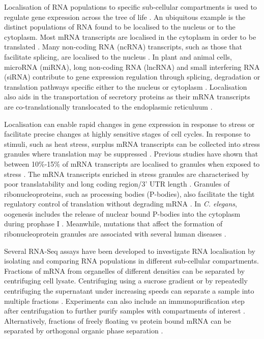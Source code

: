\documentclass[../main.tex]{subfiles}
\begin{document}
Localisation of RNA populations to specific sub-cellular compartments is used to regulate gene expression across the tree of life \parencite{Das2021}.
An ubiquitous example is the distinct populations of RNA found to be localised to the nucleus or to the cytoplasm. 
Most mRNA transcripts are localised in the cytoplasm in order to be translated \parencite{Kohler2007}.
Many non-coding RNA (ncRNA) transcripts, such as those that facilitate splicing, are localised to the nucleus \parencite{Will2011}. 
In plant and animal cells, microRNA (miRNA), long non-coding RNA (lncRNA) and small interfering RNA (siRNA) contribute to gene expression regulation through splicing, degradation or translation pathways specific either to the nucleus or cytoplasm \parencite{Hombach2016}.
Localisation also aids in the transportation of secretory proteins as their mRNA transcripts are co-translationally translocated to the endoplasmic reticuluum \parencite{Jan2014}.

Localisation can enable rapid changes in gene expression in response to stress or facilitate precise changes at highly sensitive stages of cell cycles.
In response to stimuli, such as heat stress, surplus mRNA transcripts can be collected into stress granules where translation may be suppressed \parencite{Anderson2009}. 
Previous studies have shown that between 10\%-15\% of mRNA transcripts are localised to granules when exposed to stress \parencite{VanTreeck2018,Khong2017}.
The mRNA transcripts enriched in stress granules are characterised by poor translatability and long coding region/3' UTR length \parencite{Khong2017}.
Granules of ribonucleoproteins, such as processing bodies (P-bodies), also facilitate the tight regulatory control of translation without degrading mRNA \parencite{Buchan2014}.
In \textit{C. elegans}, oogenesis includes the release of nuclear bound P-bodies into the cytoplasm during prophase I \parencite{Voronina2011}.
Meanwhile, mutations that affect the formation of ribonucleoprotein granules are associated with several human diseases \parencite{Mackenzie2017}. 

Several RNA-Seq assays have been developed to investigate RNA localisation by isolating and comparing RNA populations in different sub-cellular compartments.
Fractions of mRNA from organelles of different densities can be separated by centrifuging cell lysate. 
Centrifuging using a sucrose gradient or by repeatedly centrifuging the supernatant under increasing speeds can separate a sample into multiple fractions \parencite{Iserman2020, Dunham2012, Hu2017}.
Experiments can also include an immunopurification step after centrifugation to further purify samples with compartments of interest \parencite{Khong2017}.
Alternatively, fractions of freely floating vs protein bound mRNA can be separated by orthogonal organic phase separation \parencite{Queiroz2019}. 
\end{document}
